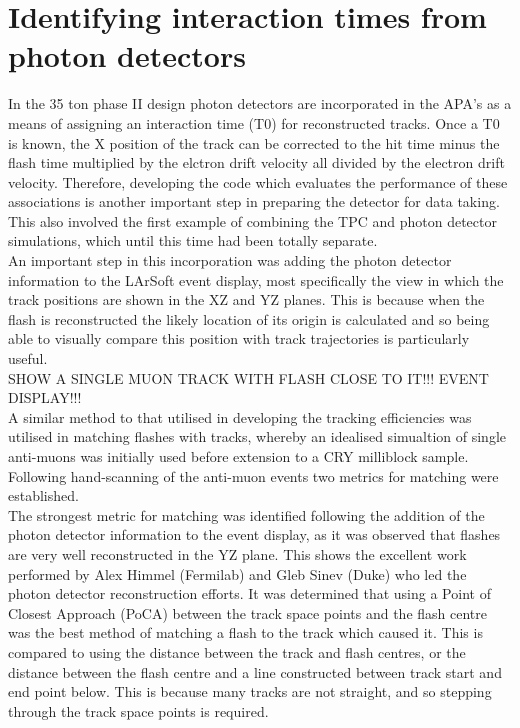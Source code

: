 \documentclass[11pt]{report} %
\begin{document}
{\section{Identifying interaction times from photon detectors}
In the 35 ton phase II design photon detectors are incorporated in the APA's as a means of assigning an interaction time (T0) for reconstructed tracks. Once a T0 is known, the X position of the track can be corrected to the hit time minus the flash time multiplied by the elctron drift velocity all divided by the electron drift velocity. Therefore, developing the code which evaluates the performance of these associations is another important step in preparing the detector for data taking. This also involved the first example of combining the TPC and photon detector simulations, which until this time had been totally separate. \\

An important step in this incorporation was adding the photon detector information to the LArSoft event display, most specifically the view in which the track positions are shown in the XZ and YZ planes. This is because when the flash is reconstructed the likely location of its origin is calculated and so being able to visually compare this position with track trajectories is particularly useful. \\

SHOW A SINGLE MUON TRACK WITH FLASH CLOSE TO IT!!! EVENT DISPLAY!!!\\

A similar method to that utilised in developing the tracking efficiencies was utilised in matching flashes with tracks, whereby an idealised simualtion of single anti-muons was initially used before extension to a CRY milliblock sample. Following hand-scanning of the anti-muon events two metrics for matching were established. \\

The strongest metric for matching was identified following the addition of the photon detector information to the event display, as it was observed that flashes are very well reconstructed in the YZ plane. This shows the excellent work performed by Alex Himmel (Fermilab) and Gleb Sinev (Duke) who led the photon detector reconstruction efforts. It was determined that using a Point of Closest Approach (PoCA) between the track space points and the flash centre was the best method of matching a flash to the track which caused it. This is compared to using the distance between the track and flash centres, or the distance between the flash centre and a line constructed between track start and end point below. This is because many tracks are not straight, and so stepping through the track space points is required. \\

}
\end{document}
